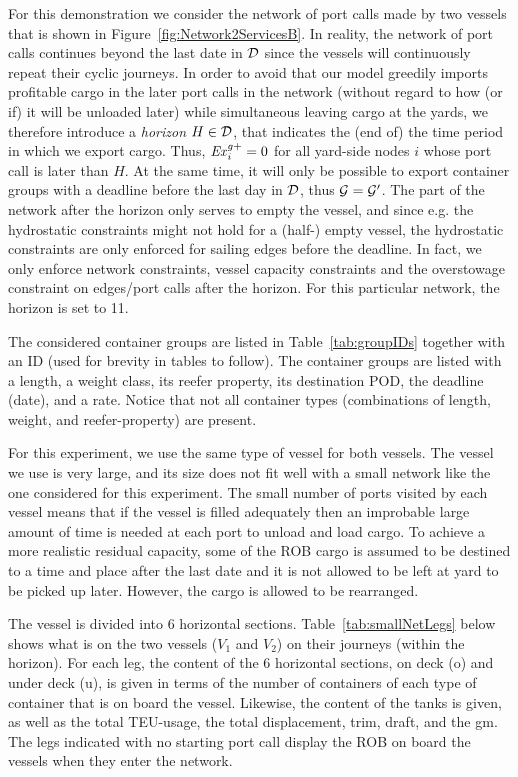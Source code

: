 For this demonstration we consider the network of port calls made by two vessels that is shown in Figure~\ref{fig:Network2ServicesB}. 
In reality, the network of port calls continues beyond the last date in $\mathcal{D}$ since the vessels will continuously repeat their cyclic journeys. In order to avoid that our model greedily imports profitable cargo in the later port calls in the network (without regard to how (or if) it will be unloaded later) while simultaneous leaving cargo at the yards, we therefore introduce a \emph{horizon} $H\in\mathcal{D}$, that indicates the (end of) the time period in which we export cargo. Thus, $\mathit{Ex}^{g+}_i=0$ for all yard-side nodes $i$ whose port call is later than $H$. At the same time, it will only be possible to export container groups with a deadline before the last day in $\mathcal{D}$, thus $\mathcal{G}=\mathcal{G}'$. The part of the network after the horizon only serves to empty the vessel, and since e.g. the hydrostatic constraints might not hold for a (half-) empty vessel, the hydrostatic constraints are only enforced for sailing edges before the deadline. In fact, we only enforce network constraints, vessel capacity constraints and the overstowage constraint on edges/port calls after the horizon. For this particular network, the horizon is set to 11.

     
The considered container groups are listed in Table~\ref{tab:groupIDs} together with an ID (used for brevity in tables to follow). The container groups are listed with a length, a weight class, its reefer property, its destination POD, the deadline (date), and a rate. Notice that not all container types (combinations of length, weight, and reefer-property) are present.

For this experiment, we use the same type of vessel for both vessels. The vessel we use is very large, and its size does not fit well with a small network like the one considered for this experiment. The small number of ports visited by each vessel means that if the vessel is filled adequately then an improbable large amount of time is needed at each port to unload and load cargo. 
To achieve a more realistic residual capacity, some of the ROB cargo is assumed to be destined to a time and place after the last date and it is not allowed to be left at yard to be picked up later. However, the cargo is allowed to be rearranged.

The vessel is divided into 6 horizontal sections. 
Table~\ref{tab:smallNetLegs} below shows what is on the two vessels ($V_1$ and $V_2$) on their journeys (within the horizon). For each leg, the content of the 6 horizontal sections, on deck (o) and under deck (u), is given in terms of the number of containers of each type of container that is on board the vessel. Likewise, the content of the tanks is given,
as well as the total TEU-usage, the total displacement, trim, draft, and the gm. The legs indicated with no starting port call display the ROB on board the vessels when they enter the network.

